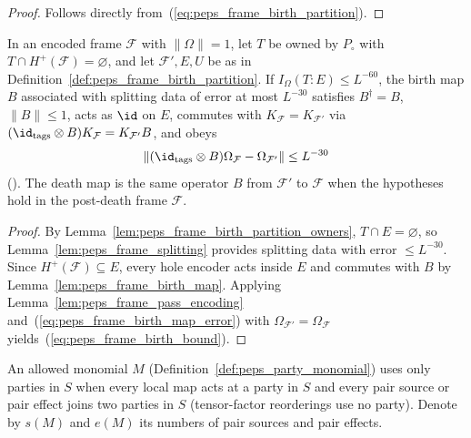 \begin{proof}\leanok
    Follows directly from~(\ref{eq:peps_frame_birth_partition}).
\end{proof}

\begin{theorem}
    \label{thm:peps_frame_birth}
    \leanok
    In an encoded frame $\mathcal F$ with $\lVert\Omega\rVert=1$, let $T$ be
    owned by $P_\circ$ with $T\cap H^+(\mathcal F)=\varnothing$, and let
    $\mathcal F',E,U$ be as in Definition~\ref{def:peps_frame_birth_partition}.
    If $I_\Omega(T:E)\le L^{-60}$, the birth map $B$ associated with splitting
    data of error at most $L^{-30}$ satisfies $B^\dagger=B$, $\|B\|\le 1$, acts
    as $\id$ on $E$, commutes with $K_{\mathcal F}=K_{\mathcal F'}$ via
    $(\id_{\rm tags}\otimes B)K_{\mathcal F}=K_{\mathcal F'}B$, and obeys
    \begin{align}
        \lVert(\id_{\rm tags}\otimes B)\Omega_{\mathcal F}-\Omega_{\mathcal F'}\rVert
        \le L^{-30}
        \label{eq:peps_frame_birth_bound}
    \end{align}
    (\cite[Lemma~6.5]{OpenAI2026PolynomialPEPS}). The death map is the same
    operator $B$ from $\mathcal F'$ to $\mathcal F$ when the hypotheses hold in
    the post-death frame $\mathcal F$.
\end{theorem}

\begin{proof}\leanok
    By Lemma~\ref{lem:peps_frame_birth_partition_owners}, $T\cap E=\varnothing$,
    so Lemma~\ref{lem:peps_frame_splitting} provides splitting data with error
    $\le L^{-30}$. Since $H^+(\mathcal F)\subseteq E$, every hole encoder acts
    inside $E$ and commutes with $B$ by Lemma~\ref{lem:peps_frame_birth_map}.
    Applying Lemma~\ref{lem:peps_frame_pass_encoding} and~(\ref{eq:peps_frame_birth_map_error})
    with $\Omega_{\mathcal F'}=\Omega_{\mathcal F}$ yields~(\ref{eq:peps_frame_birth_bound}).
\end{proof}

\begin{definition}
    \label{def:peps_monomial_parties}
    \leanok
    An allowed monomial $M$ (Definition~\ref{def:peps_party_monomial}) uses
    only parties in $S$ when every local map acts at a party in $S$ and every
    pair source or pair effect joins two parties in $S$ (tensor-factor
    reorderings use no party). Denote by $s(M)$ and $e(M)$ its numbers of pair
    sources and pair effects.
\end{definition}


